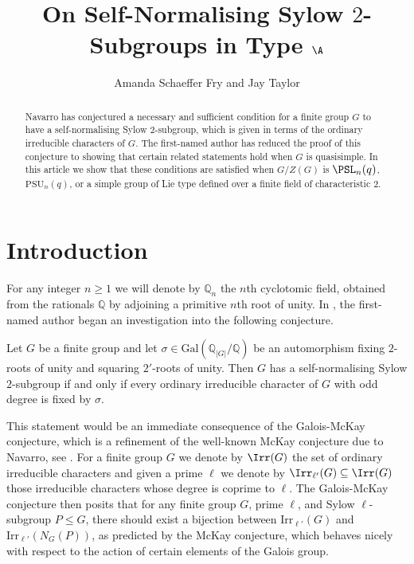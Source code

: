 \documentclass[eqthmnum, nocolour]{jt-calcs}
\title{On Self-Normalising Sylow $2$-Subgroups in Type $\A$}
\author{Amanda Schaeffer Fry and Jay Taylor}
\newcommand{\Q}{\mathbb{Q}}
\newcommand{\irr}{\mathrm{Irr}}
\newcommand{\gal}{\mathrm{Gal}}
\newcommand{\PSU}{\mathrm{PSU}}
\begin{document}
\begin{abstract}
Navarro has conjectured a necessary and sufficient condition for a finite group $G$ to have a self-normalising Sylow $2$-subgroup, which is given in terms of the ordinary irreducible characters of $G$. The first-named author has reduced the proof of this conjecture to showing that certain related statements hold when $G$ is quasisimple. In this article we show that these conditions are satisfied when $G/Z(G)$ is $\PSL_n(q)$, $\PSU_n(q)$, or a simple group of Lie type defined over a finite field of characteristic $2$.
\end{abstract}



\section{Introduction}

\begin{pa}
For any integer $n \geqslant 1$ we will denote by $\Q_n$ the $n$th cyclotomic field, obtained from the rationals $\mathbb{Q}$ by adjoining a primitive $n$th root of unity. In \cite{schaeffer-fry:2015:odd-degree-characters}, the first-named author began an investigation into the following conjecture.
\end{pa}

\begin{conj}[Navarro]\label{mainprob}
Let $G$ be a finite group and let $\sigma\in\gal(\Q_{|G|}/\Q)$ be an automorphism fixing $2$-roots of unity and squaring $2'$-roots of unity. Then $G$ has a self-normalising Sylow $2$-subgroup if and only if every ordinary irreducible character of $G$ with odd degree is fixed by $\sigma$.
\end{conj}

\begin{pa}
This statement would be an immediate consequence of the Galois-McKay conjecture, which is a refinement of the well-known McKay conjecture due to Navarro, see \cite[Conjecture A]{navarro:2004:galois-mckay}. For a finite group $G$ we denote by $\Irr(G)$ the set of ordinary irreducible characters and given a prime $\ell$ we denote by $\Irr_{\ell'}(G) \subseteq \Irr(G)$ those irreducible characters whose degree is coprime to $\ell$. The Galois-McKay conjecture then posits that for any finite group $G$, prime $\ell$, and Sylow $\ell$-subgroup $P \leqslant G$, there should exist a bijection between $\irr_{\ell'}(G)$ and $\irr_{\ell'}(N_G(P))$, as predicted by the McKay conjecture, which behaves nicely with respect to the action of certain elements of the Galois group.
\end{pa}
\end{document}
